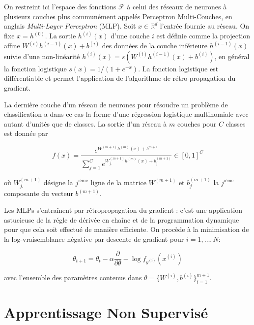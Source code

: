 On restreint ici l'espace des fonctions $\mathcal{F}$ à celui des réseaux de
neurones à plusieurs couches plus communément appelés Perceptron Multi-Couches,
en anglais \textit{Multi-Layer Perceptron} (MLP)\citep{Rosenblatt-1958}. Soit
$x\in\mathbb{R}^d$ l'entrée fournie au réseau. On fixe $x=h^{(0)}$. La sortie
$h^{(i)}(x)$ d'une couche $i$ est définie comme la projection affine
$W^{(i)}h^{(i-1)}(x) + b^{(i)}$ des données de la couche inférieure $h^{(i-1)}(x)$
suivie d'une non-linéarité $h^{(i)}(x)= s(W^{(i)}h^{(i-1)}(x) + b^{(i)})$, en
général la fonction logistique $s(x)=1/(1+e^{-x})$. La fonction logistique est différentiable et
permet l'application de l'algorithme de rétro-propagation du gradient. 

La dernière couche d'un réseau de neurones pour résoudre un problème de
classification a dans ce cas la forme d'une régression logistique multinomiale
avec autant d'unités que de classes. La sortie d'un réseau à $m$ couches pour
$C$ classes est donnée par

\begin{equation}
\label{eq:softmax}
f(x) = \frac{e^{W^{(m+1)} h^{(m)}(x) + b^{m+1}}}{\sum_{j=1}^C e^{W^{(m+1)}_{j.} h^{(m)}(x) + b^{(m+1)}_{j} }} \in [0,1]^{C}
\end{equation}

où $W_{j.}^{(m+1)}$ désigne la $j^\textrm{ième}$ ligne de la matrice $W^{(m+1)}$
et $b_{j}^{(m+1)}$ la $j^\textrm{ième}$ composante du vecteur $b^{(m+1)}$.

Les MLPs s'entraînent par rétropropagation du gradient \citep{Rumelhart86b}:
c'est une application astucieuse de la régle de dérivée en chaîne et de la
programmation dynamique pour que cela soit effectué de manière efficiente. On
procède à la minimisation de la log-vraisemblance négative par descente de
gradient pour $i=1,\dots,N$:

\begin{equation}
\theta_{t+1} = \theta_{t} - \alpha \dfrac{\partial}{\partial\theta} -\log f_{y^{(i)}}(x^{(i)})
\end{equation}

avec l'ensemble des paramètres contenus dans $\theta=\lbrace W^{(i)},b^{(i)}\rbrace_{i=1}^{m+1}$.




\section{Apprentissage Non Supervisé}

